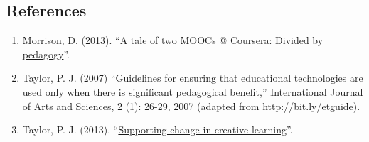 \subsection{References}

\begin{enumerate}
\item
  Morrison, D. (2013). ``\href{http://bit.ly/164uqkJ}{A tale of two MOOCs @ Coursera: Divided by pedagogy}''.
\item
  Taylor, P. J. (2007) ``Guidelines for ensuring that educational
  technologies are used only when there is significant pedagogical
  benefit,'' International Journal of Arts and Sciences, 2 (1): 26-29,
  2007 (adapted from \href{http://bit.ly/etguide}{http://bit.ly/etguide}).
\item
  Taylor, P. J. (2013). ``\href{http://wp.me/p1gwfa-vv}{Supporting change in creative learning}''.
\end{enumerate}

